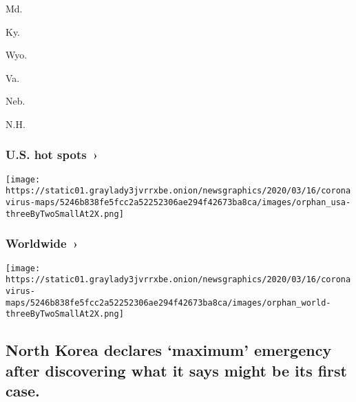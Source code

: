 \href{https://www.nytimes3xbfgragh.onion/interactive/2020/us/maryland-coronavirus-cases.html}{}

Md.

\href{https://www.nytimes3xbfgragh.onion/interactive/2020/us/kentucky-coronavirus-cases.html}{}

Ky.

\href{https://www.nytimes3xbfgragh.onion/interactive/2020/us/wyoming-coronavirus-cases.html}{}

Wyo.

\href{https://www.nytimes3xbfgragh.onion/interactive/2020/us/virginia-coronavirus-cases.html}{}

Va.

\href{https://www.nytimes3xbfgragh.onion/interactive/2020/us/nebraska-coronavirus-cases.html}{}

Neb.

\href{https://www.nytimes3xbfgragh.onion/interactive/2020/us/new-hampshire-coronavirus-cases.html}{}

N.H.

\href{https://www.nytimes3xbfgragh.onion/interactive/2020/us/coronavirus-us-cases.html}{}

\hypertarget{us-hot-spots-}{%
\subsubsection{U.S. hot spots~›}\label{us-hot-spots-}}

\texttt{[image: https://static01.graylady3jvrrxbe.onion/newsgraphics/2020/03/16/coronavirus-maps/5246b838fe5fcc2a52252306ae294f42673ba8ca/images/orphan\_usa-threeByTwoSmallAt2X.png]}

\href{https://www.nytimes3xbfgragh.onion/interactive/2020/world/coronavirus-maps.html}{}

\hypertarget{worldwide-}{%
\subsubsection{Worldwide~›}\label{worldwide-}}

\texttt{[image: https://static01.graylady3jvrrxbe.onion/newsgraphics/2020/03/16/coronavirus-maps/5246b838fe5fcc2a52252306ae294f42673ba8ca/images/orphan\_world-threeByTwoSmallAt2X.png]}

\hypertarget{north-korea-declares-maximum-emergency-after-discovering-what-it-says-might-be-its-first-case}{%
\subsection{North Korea declares `maximum' emergency after discovering
what it says might be its first
case.}\label{north-korea-declares-maximum-emergency-after-discovering-what-it-says-might-be-its-first-case}}

